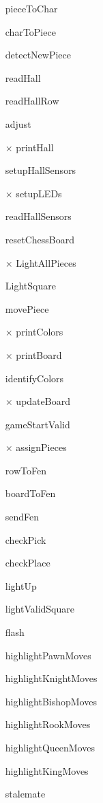 \documentclass[12pt, titlepage]{article}
\begin{document}
\begin{itemize}
  \item[\checkmark] pieceToChar
  \item[\checkmark] charToPiece
  \item[\checkmark] detectNewPiece
  \item[\checkmark] readHall
  \item[\checkmark] readHallRow
  \item[\checkmark] adjust
  \item[$\times$] printHall
  \item[\checkmark] setupHallSensors
  \item[$\times$] setupLEDs
  \item[\checkmark] readHallSensors
  \item[\checkmark] resetChessBoard
  \item[$\times$] LightAllPieces
  \item[\checkmark] LightSquare
  \item[\checkmark] movePiece
  \item[$\times$] printColors
  \item[$\times$] printBoard
  \item[\checkmark] identifyColors
  \item[$\times$] updateBoard
  \item[\checkmark] gameStartValid
  \item[$\times$] assignPieces
  \item[\checkmark] rowToFen
  \item[\checkmark] boardToFen
  \item[\checkmark] sendFen
  \item[\checkmark] checkPick
  \item[\checkmark] checkPlace
  \item[\checkmark] lightUp
  \item[\checkmark] lightValidSquare
  \item[\checkmark] flash
  \item[\checkmark] highlightPawnMoves
  \item[\checkmark] highlightKnightMoves
  \item[\checkmark] highlightBishopMoves
  \item[\checkmark] highlightRookMoves
  \item[\checkmark] highlightQueenMoves
  \item[\checkmark] highlightKingMoves
  \item[\checkmark] stalemate

\end{itemize}
\end{document}
